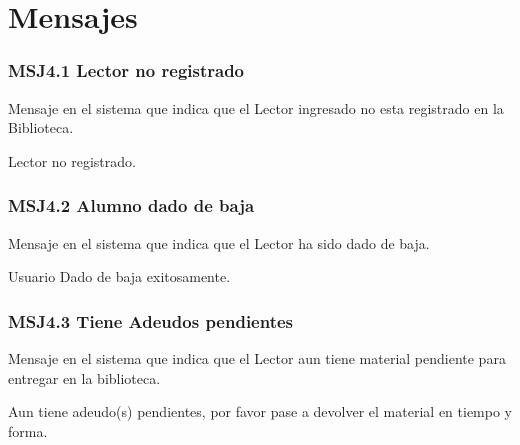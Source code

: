\chapter{Mensajes}
\label{appendix:Mensajes}












\subsection{MSJ4.1 Lector no registrado }

Mensaje en el sistema que indica que el Lector ingresado no esta registrado en la Biblioteca.

  \noindent Lector no registrado.
 
 \subsection{MSJ4.2 Alumno dado de baja }

Mensaje en el sistema que indica que el Lector ha sido dado de baja.

  \noindent Usuario Dado de baja exitosamente.
  
  \subsection{MSJ4.3 Tiene Adeudos pendientes }

Mensaje en el sistema que indica que el Lector aun tiene material pendiente para entregar en la biblioteca.

  \noindent Aun tiene adeudo(s) pendientes, por favor pase a devolver el material en tiempo y forma. 

